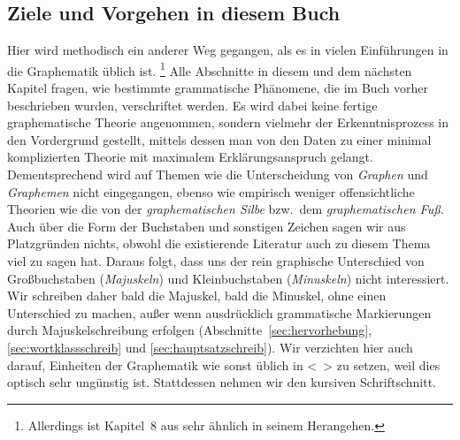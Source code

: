 \subsection{Ziele und Vorgehen in diesem Buch}

Hier wird methodisch ein anderer Weg gegangen, als es in vielen Einführungen in die Graphematik üblich ist.%
\footnote{Allerdings ist Kapitel~8 aus \citet{Eisenberg1} sehr ähnlich in seinem Herangehen.}
Alle Abschnitte in diesem und dem nächsten Kapitel fragen, wie bestimmte grammatische Phänomene, die im Buch vorher beschrieben wurden, verschriftet werden.
Es wird dabei keine fertige graphematische Theorie angenommen, sondern vielmehr der Erkenntnisprozess in den Vordergrund gestellt, mittels dessen man von den Daten zu einer minimal komplizierten Theorie mit maximalem Erklärungsanspruch gelangt.
Dementsprechend wird auf Themen wie \zB die Unterscheidung von \textit{Graphen} und \textit{Graphemen} nicht eingegangen, ebenso wie empirisch weniger offensichtliche Theorien wie die von der \textit{graphematischen Silbe} bzw.\ dem \textit{graphematischen Fuß}.
Auch über die Form der Buchstaben und sonstigen Zeichen sagen wir aus Platzgründen nichts, obwohl die existierende Literatur auch zu diesem Thema viel zu sagen hat.
Daraus folgt, dass uns der rein graphische Unterschied von Großbuchstaben (\textit{Majuskeln}) und Kleinbuchstaben (\textit{Minuskeln}) nicht interessiert.
Wir schreiben daher bald die Majuskel, bald die Minuskel, ohne einen Unterschied zu machen, außer wenn ausdrücklich grammatische Markierungen durch Majuskelschreibung erfolgen (Abschnitte~\ref{sec:hervorhebung}, \ref{sec:wortklassschreib} und \ref{sec:hauptsatzschreib}).
Wir verzichten hier auch darauf, Einheiten der Graphematik wie sonst üblich in <~> zu setzen, weil dies optisch sehr ungünstig ist.
Stattdessen nehmen wir den kursiven Schriftschnitt.

